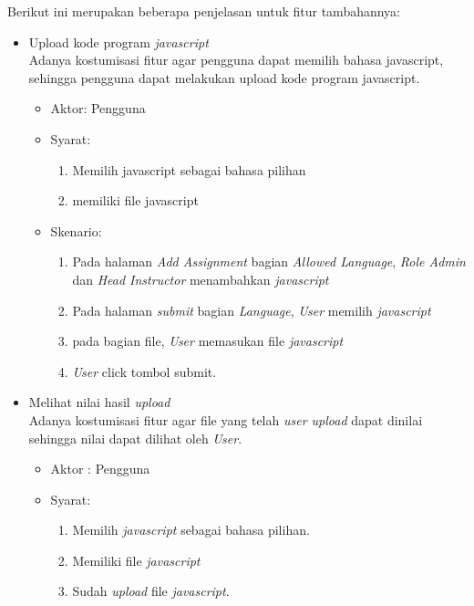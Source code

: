  Berikut ini merupakan beberapa penjelasan untuk fitur tambahannya:
 \begin{itemize}
     \item Upload kode program \textit{javascript} \\
     Adanya kostumisasi fitur agar pengguna dapat memilih bahasa javascript, sehingga pengguna dapat melakukan upload kode program javascript. 
     \begin{itemize}
         \item Aktor: Pengguna
         \item Syarat: 
            \begin{enumerate}
                \item Memilih javascript sebagai bahasa pilihan
                \item memiliki file javascript
            \end{enumerate}
        \item Skenario: 
            \begin{enumerate}
                \item Pada halaman \textit{Add Assignment} bagian \textit{Allowed Language},  \textit{Role Admin} dan \textit{Head Instructor} menambahkan \textit{javascript} 
                \item Pada halaman \textit{submit} bagian \textit{Language}, \textit{User} memilih \textit{javascript}
                \item pada bagian file, \textit{User} memasukan file \textit{javascript}
                \item \textit{User} click tombol submit.
            \end{enumerate}
     \end{itemize}
        \item Melihat nilai hasil \textit{upload}\\
            Adanya kostumisasi fitur agar file yang telah \textit{user upload} dapat dinilai sehingga nilai dapat dilihat oleh \textit{User}.
            \begin{itemize}
                \item Aktor : Pengguna 
                \item Syarat: 
                \begin{enumerate}
                    \item Memilih \textit{javascript} sebagai bahasa pilihan.
                    \item Memiliki file \textit{javascript}
                    \item Sudah \textit{upload} file \textit{javascript}.

\end{enumerate}
\end{itemize}
\end{itemize}

